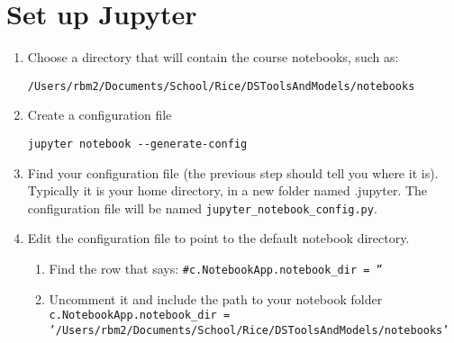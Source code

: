 \documentclass[11pt]{article}
\renewcommand\:{\colon} %
\begin{document}
\section{Set up Jupyter}
\begin{enumerate}
\item Choose a directory that will contain the course notebooks, such as:
\begin{verbatim}
/Users/rbm2/Documents/School/Rice/DSToolsAndModels/notebooks
\end{verbatim}
\item Create a configuration file
\begin{verbatim}
jupyter notebook --generate-config
\end{verbatim}
\item Find your configuration file (the previous step should tell you where it is). Typically it is your home directory, in a new folder named .jupyter. The configuration file will be named \texttt{jupyter\_notebook\_config.py}.
\item Edit the configuration file to point to the default notebook directory.
\begin{enumerate}
\item Find the row that says: \texttt{\#c.NotebookApp.notebook\_dir = ''}
\item Uncomment it and include the path to your notebook folder\\
\small{\texttt{c.NotebookApp.notebook\_dir = '/Users/rbm2/Documents/School/Rice/DSToolsAndModels/notebooks'}}
\end{enumerate}
\end{enumerate}
\end{document}
